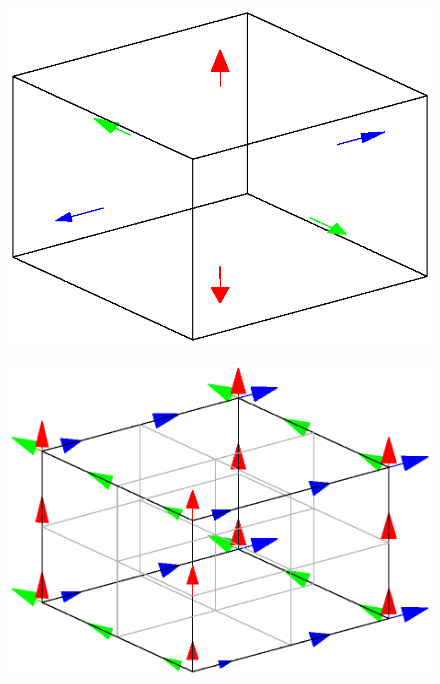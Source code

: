 \documentclass{report}
\begin{document}
\begin{figure}
\begin{minipage}{.5\textwidth}
  \centering
  \includegraphics[width=0.7\linewidth]{lfricdoc_figures/k0_W2_dofs.eps}
  \label{fig:k0w2}
\end{minipage}%
\begin{minipage}{.5\textwidth}
  \centering
  \includegraphics[width=0.7\linewidth]{lfricdoc_figures/k1_W2_dofs.eps}
  \label{fig:k1w2}
\end{minipage}


\end{figure}
\end{document}
